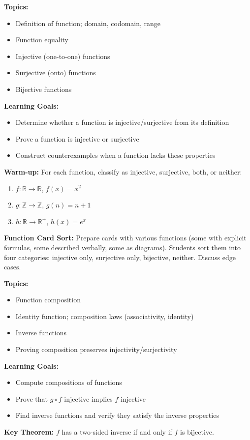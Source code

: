 \documentclass[11pt]{article}
\begin{document}
\begin{classabox}
\textbf{Topics:}
\begin{itemize}
    \item Definition of function; domain, codomain, range
    \item Function equality
    \item Injective (one-to-one) functions
    \item Surjective (onto) functions
    \item Bijective functions
\end{itemize}

\textbf{Learning Goals:}
\begin{itemize}
    \item Determine whether a function is injective/surjective from its definition
    \item Prove a function is injective or surjective
    \item Construct counterexamples when a function lacks these properties
\end{itemize}

\textbf{Warm-up:} For each function, classify as injective, surjective, both, or neither:
\begin{enumerate}
    \item $f: \mathbb{R} \to \mathbb{R}$, $f(x) = x^2$
    \item $g: \mathbb{Z} \to \mathbb{Z}$, $g(n) = n + 1$
    \item $h: \mathbb{R} \to \mathbb{R}^+$, $h(x) = e^x$
\end{enumerate}
\end{classabox}

\begin{activitybox}
\textbf{Function Card Sort:} Prepare cards with various functions (some with explicit formulas, some described verbally, some as diagrams). Students sort them into four categories: injective only, surjective only, bijective, neither. Discuss edge cases.
\end{activitybox}

\begin{classbbox}
\textbf{Topics:}
\begin{itemize}
    \item Function composition
    \item Identity function; composition laws (associativity, identity)
    \item Inverse functions
    \item Proving composition preserves injectivity/surjectivity
\end{itemize}

\textbf{Learning Goals:}
\begin{itemize}
    \item Compute compositions of functions
    \item Prove that $g \circ f$ injective implies $f$ injective
    \item Find inverse functions and verify they satisfy the inverse properties
\end{itemize}

\textbf{Key Theorem:} $f$ has a two-sided inverse if and only if $f$ is bijective.
\end{classbbox}
\end{document}
